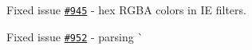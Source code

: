 
\begin{DoxyItemize}
\item Fixed issue \href{https://github.com/jakubpawlowicz/clean-css/issues/945}{\tt \#945} -\/ hex R\+G\+BA colors in IE filters.
\item Fixed issue \href{https://github.com/jakubpawlowicz/clean-css/issues/952}{\tt \#952} -\/ parsing \`{} 
\end{DoxyItemize}